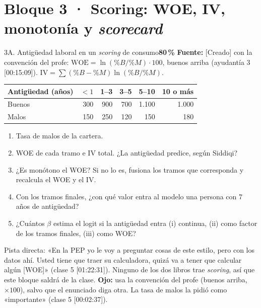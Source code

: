 \documentclass[11pt]{article}
\newcommand{\prob}[1]{\colorbox{red!15}{\textbf{#1}}}
\newcommand{\fuente}[1]{{\small\textcolor{blue!50!black}{\textbf{Fuente:} #1}}\par}
\newcommand{\bloque}[2]{\section*{Bloque #1 · #2}}
\begin{document}
\bloque{3}{Scoring: WOE, IV, monotonía y \emph{scorecard}}

\begin{ej}{3A. Antigüedad laboral en un \emph{scoring} de consumo}{\prob{80\,\%}}
\fuente{[Creado] con la convención del profe: $\text{WOE}=\ln(\%B/\%M)\cdot100$, buenos arriba (ayudantía 3 [00:15:09]). $\text{IV}=\sum(\%B-\%M)\ln(\%B/\%M)$.}
\begin{center}\small
\begin{tabular}{lrrrrr}\toprule
Antigüedad (años) & $<1$ & 1--3 & 3--5 & 5--10 & 10 o más\\\midrule
Buenos & 300 & 900 & 700 & 1.100 & 1.000\\
Malos & 150 & 250 & 120 & 150 & 180\\\bottomrule
\end{tabular}
\end{center}
\begin{enumerate}[label=\alph*),itemsep=0pt,topsep=2pt]
\item Tasa de malos de la cartera.
\item WOE de cada tramo e IV total. ¿La antigüedad predice, según Siddiqi?
\item ¿Es monótono el WOE? Si no lo es, fusiona los tramos que corresponda y recalcula el WOE y el IV.
\item Con los tramos finales, ¿con qué valor entra al modelo una persona con 7 años de antigüedad?
\item ¿Cuántos $\beta$ estima el logit si la antigüedad entra (i) continua, (ii) como factor de los tramos finales, (iii) como WOE?
\end{enumerate}
\end{ej}
\begin{porque}
Pista directa: «En la PEP yo le voy a preguntar cosas de este estilo, pero con los datos ahí. Usted tiene que traer su calculadora, quizá va a tener que calcular algún [WOE]» (clase 5 [01:22:31]). Ninguno de los dos libros trae \emph{scoring}, así que este bloque saldrá de la clase. \textbf{Ojo:} usa la convención del profe (buenos arriba, $\times100$), salvo que el enunciado diga otra. La tasa de malos la pidió como «importante» (clase 5 [00:02:37]).
\end{porque}
\end{document}
